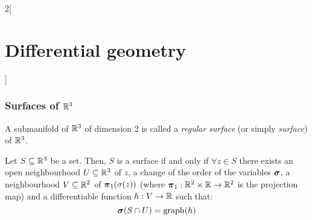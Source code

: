 \documentclass[../../../main.tex]{subfiles}
\begin{document}
\begin{multicols}{2}[\section{Differential geometry}]
  \subsubsection{Surfaces of \texorpdfstring{$\mathbb{R}^3$}{R3}}
  \begin{definition}
    A submanifold of $\mathbb{R}^3$ of dimension 2 is called a \emph{regular surface} (or simply \emph{surface}) of $\mathbb{R}^3$.
  \end{definition}
  \begin{proposition}
    Let $S\subseteq\mathbb{R}^3$ be a set. Then, $S$ is a surface if and only if $\forall z\in S$ there exists an open neighbourhood $U\subseteq \mathbb{R}^3$ of $z$, a change of the order of the variables $\boldsymbol{\mathrm{\sigma}}$, a neighbourhood $V\subseteq \mathbb{R}^2$ of $\boldsymbol{\mathrm{\pi}}_1(\sigma(z))$ (where $\boldsymbol{\mathrm{\pi}}_1:\mathbb{R}^2\times \mathbb{R}\rightarrow\mathbb{R}^2$ is the projection map) and a differentiable function $h:V\rightarrow \mathbb{R}$ such that: $$\boldsymbol{\mathrm{\sigma}}(S\cap U)=\operatorname{graph}(h)$$
  \end{proposition}

\end{multicols}
\end{document}
